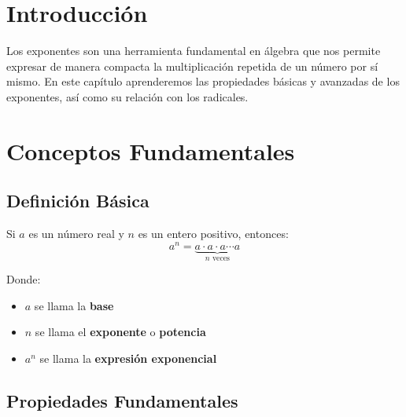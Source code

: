 \begin{teoria}[
  materia=algebra,
  capitulo=exponentes,
  nivel=basico,
  titulo="Exponentes y Radicales",
  descripcion="Conceptos fundamentales y propiedades de exponentes y radicales",
  tiempo_estimado=30,
  dificultad=2,
  prerequisitos={aritmetica_basica},
  objetivos={"Comprender las propiedades de exponentes", "Simplificar expresiones con exponentes", "Resolver problemas con radicales"},
  tags={exponentes, potencias, radicales, propiedades}
]


\section{Introducción}

Los exponentes son una herramienta fundamental en álgebra que nos permite expresar de manera compacta la multiplicación repetida de un número por sí mismo. En este capítulo aprenderemos las propiedades básicas y avanzadas de los exponentes, así como su relación con los radicales.


\section{Conceptos Fundamentales}

\subsection{Definición Básica}

Si $a$ es un número real y $n$ es un entero positivo, entonces:
$$a^n = \underbrace{a \cdot a \cdot a \cdots a}_{n \text{ veces}}$$

Donde:
\begin{itemize}
\item $a$ se llama la \textbf{base}
\item $n$ se llama el \textbf{exponente} o \textbf{potencia}
\item $a^n$ se llama la \textbf{expresión exponencial}
\end{itemize}

\subsection{Propiedades Fundamentales}


\end{teoria}
